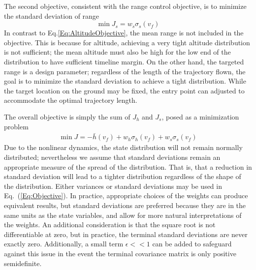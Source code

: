 The second objective, consistent with the range control objective, is to minimize the standard deviation of range 
\begin{equation}
	\min J_s = w_s\sigma_s(v_f) \label{Eq:RangeObjective}
\end{equation}
In contrast to Eq.\eqref{Eq:AltitudeObjective}, the mean range is not included in the objective. This is because for altitude, achieving a very tight altitude distribution is not sufficient; the mean altitude must also be high for the low end of the distribution to have sufficient timeline margin. On the other hand, the targeted range is a design parameter; regardless of the length of the trajectory flown, the goal is to minimize the standard deviation to achieve a tight distribution. While the target location on the ground may be fixed, the entry point can adjusted to accommodate the optimal trajectory length. 

The overall objective is simply the sum of $J_h$ and $J_s$, posed as a minimization problem
\begin{align}
	\min J = -\bar{h}(v_f) + w_h\sigma_h(v_f) + w_s\sigma_s(v_f) \label{Eq:Objective}
\end{align}
Due to the nonlinear dynamics, the state distribution will not remain normally distributed; nevertheless we assume that standard deviations remain an appropriate measure of the spread of the distribution. That is, that a reduction in standard deviation will lead to a tighter distribution regardless of the shape of the distribution. Either variances or standard deviations may be used in Eq.~(\ref{Eq:Objective}). In practice, appropriate choices of the weights can produce equivalent results, but standard deviations are preferred because they are in the same units as the state variables, and allow for more natural interpretations of the weights. An additional consideration is that the square root is not differentiable at zero, but in practice, the terminal standard deviations are never exactly zero. Additionally, a small term $\epsilon<<1$ can be added to safeguard against this issue in the event the terminal covariance matrix is only positive semidefinite.


